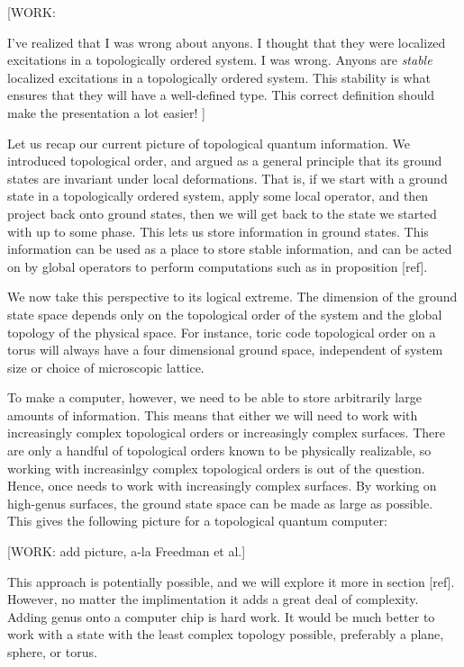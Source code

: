 [WORK:

I've realized that I was wrong about anyons. I thought that they were localized excitations in a topologically ordered system. I was wrong. Anyons are \textit{stable} localized excitations in a topologically ordered system. This stability is what ensures that they will have a well-defined type. This correct definition should make the presentation a lot easier!
]

Let us recap our current picture of topological quantum information. We introduced topological order, and argued as a general principle that its ground states are invariant under local deformations. That is, if we start with a ground state in a topologically ordered system, apply some local operator, and then project back onto ground states, then we will get back to the state we started with up to some phase. This lets us store information in ground states. This information can be used as a place to store stable information, and can be acted on by global operators to perform computations such as in proposition [ref].

We now take this perspective to its logical extreme. The dimension of the ground state space depends only on the topological order of the system and the global topology of the physical space. For instance, toric code topological order on a torus will always have a four dimensional ground space, independent of system size or choice of microscopic lattice.

To make a computer, however, we need to be able to store arbitrarily large amounts of information. This means that either we will need to work with increasingly complex topological orders or increasingly complex surfaces. There are only a handful of topological orders known to be physically realizable, so working with increasinlgy complex topological orders is out of the question. Hence, once needs to work with increasingly complex surfaces. By working on high-genus surfaces, the ground state space can be made as large as possible. This gives the following picture for a topological quantum computer:

[WORK: add picture, a-la Freedman et al.]

This approach is potentially possible, and we will explore it more in section [ref]. However, no matter the implimentation it adds a great deal of complexity. Adding genus onto a computer chip is hard work. It would be much better to work with a state with the least complex topology possible, preferably a plane, sphere, or torus.

